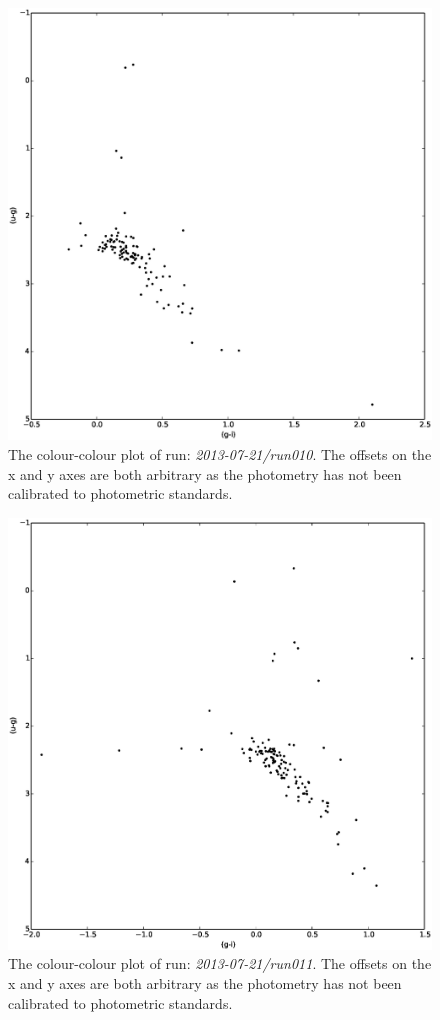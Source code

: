 \begin{figure}[!h]
\centering
\includegraphics[width=120mm]{images/2013-07-21-run010-2colour.eps}
\caption{The colour-colour plot of run: \emph{2013-07-21/run010}. The offsets on the x and y axes are both arbitrary as the photometry has not been calibrated to photometric standards.}
\label{fig:differentialtrad}
\end{figure}

\begin{figure}[!h]
\centering
\includegraphics[width=120mm]{images/2013-07-21-run011-2colour.eps}
\caption{The colour-colour plot of run: \emph{2013-07-21/run011}. The offsets on the x and y axes are both arbitrary as the photometry has not been calibrated to photometric standards.}
\label{fig:differentialtrad}
\end{figure}


